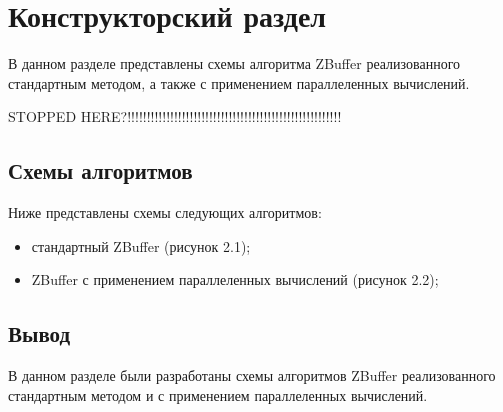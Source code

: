 \chapter{Конструкторский раздел}
В данном разделе представлены схемы алгоритма ZBuffer реализованного стандартным методом, а также с применением параллеленных вычислений.

STOPPED HERE?!!!!!!!!!!!!!!!!!!!!!!!!!!!!!!!!!!!!!!!!!!!!!!!!!!!!!!!

\section{Схемы алгоритмов}
Ниже представлены схемы следующих алгоритмов:
\begin{itemize}
	\item стандартный ZBuffer (рисунок 2.1);
	\item ZBuffer с применением параллеленных вычислений (рисунок 2.2);
\end{itemize}

\section{Вывод}
В данном разделе были разработаны схемы алгоритмов ZBuffer реализованного стандартным методом и с применением параллеленных вычислений.